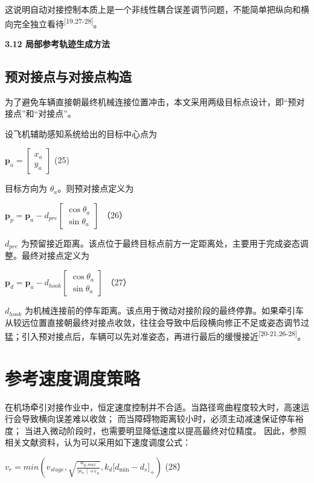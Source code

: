 这说明自动对接控制本质上是一个非线性耦合误差调节问题，不能简单把纵向和横向完全独立看待\textsuperscript{[19,27-28]}。

\textbf{3.12 局部参考轨迹生成方法}

\subsection{预对接点与对接点构造}

为了避免车辆直接朝最终机械连接位置冲击，本文采用两级目标点设计，即``预对接点''和``对接点''。

设飞机辅助感知系统给出的目标中心点为

\(\mathbf{p}_{a} = \left\lbrack \begin{array}{r}
x_{a} \\
y_{a}
\end{array} \right\rbrack\) (25)

目标方向为 \(\theta_{a}\)。则预对接点定义为

\(\mathbf{p}_{p} = \mathbf{p}_{a} - d_{pre}\left\lbrack \begin{array}{r}
\cos\theta_{a} \\
\sin\theta_{a}
\end{array} \right\rbrack\) （26）

\(d_{pre}\)
为预留接近距离。该点位于最终目标点前方一定距离处，主要用于完成姿态调整。最终对接点定义为

\(\mathbf{p}_{d} = \mathbf{p}_{a} - d_{hook}\left\lbrack \begin{array}{r}
\cos\theta_{a} \\
\sin\theta_{a}
\end{array} \right\rbrack\) （27）

\(d_{hook}\)
为机械连接前的停车距离。该点用于微动对接阶段的最终停靠。如果牵引车从较远位置直接朝最终对接点收敛，往往会导致中后段横向修正不足或姿态调节过猛；引入预对接点后，车辆可以先对准姿态，再进行最后的缓慢接近\textsuperscript{[20-21,26-28]}。

\section{参考速度调度策略}

在机场牵引对接作业中，恒定速度控制并不合适。当路径弯曲程度较大时，高速运行会导致横向误差难以收敛；
而当障碍物距离较小时，必须主动减速保证停车裕度；
当进入微动阶段时，也需要明显降低速度以提高最终对位精度。
因此，参照相关文献资料，认为可以采用如下速度调度公式：

\(v_{r} = min\left( v_{stage},\sqrt{\frac{a_{y,max}}{\mid \kappa_{r} \mid + \varepsilon_{\kappa}}},k_{d}\lbrack d_{\min} - d_{s}\rbrack_{+} \right)\)
(28）

